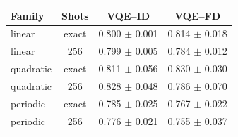 \begin{tabular}{l c c c}
\hline
Family & Shots & VQE--ID & VQE--FD \\
\hline
linear & exact & 0.800 $\pm$ 0.001 & 0.814 $\pm$ 0.018 \\
linear & 256 & 0.799 $\pm$ 0.005 & 0.784 $\pm$ 0.012 \\
quadratic & exact & 0.811 $\pm$ 0.056 & 0.830 $\pm$ 0.030 \\
quadratic & 256 & 0.828 $\pm$ 0.048 & 0.786 $\pm$ 0.070 \\
periodic & exact & 0.785 $\pm$ 0.025 & 0.767 $\pm$ 0.022 \\
periodic & 256 & 0.776 $\pm$ 0.021 & 0.755 $\pm$ 0.037 \\
\hline
\end{tabular}